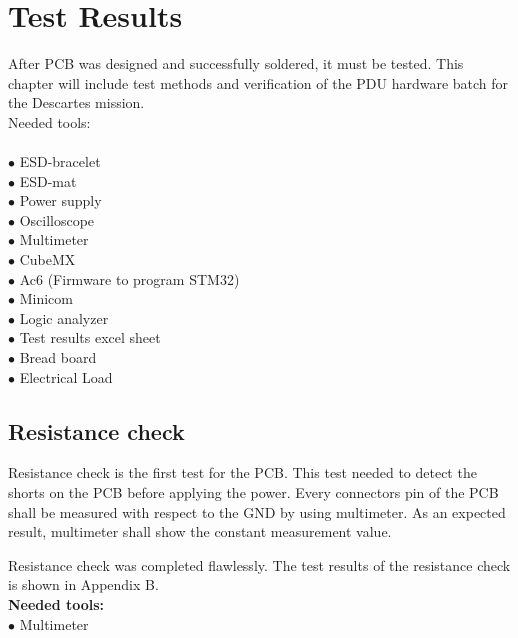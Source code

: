 \chapter{Test Results \label{6}}
After PCB was designed and successfully soldered, it must be tested.
This chapter will include test methods and verification of the PDU hardware batch for the Descartes mission.
\\
Needed tools:\\ \\
$\bullet$ ESD-bracelet\\
$\bullet$ ESD-mat\\
$\bullet$ Power supply\\
$\bullet$ Oscilloscope\\
$\bullet$ Multimeter\\
$\bullet$ CubeMX\\
$\bullet$ Ac6 (Firmware to program STM32)\\
$\bullet$ Minicom\\
$\bullet$ Logic analyzer\\
$\bullet$ Test results excel sheet\\
$\bullet$ Bread board\\
$\bullet$ Electrical Load\\



\section{Resistance check}


Resistance check is the first test for the PCB. This test needed to detect the shorts on the PCB before applying the power.
Every connectors pin of the PCB shall be measured with respect to the GND by using multimeter. As an expected result, multimeter shall show the constant measurement value.

Resistance check was completed flawlessly. The test results of the resistance check is shown in Appendix B.\\

\textbf{Needed tools:}\\
$\bullet$ Multimeter

